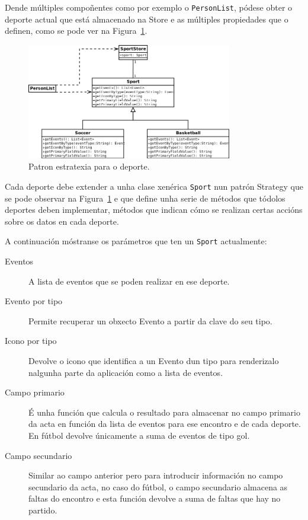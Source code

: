   Dende múltiples compoñentes como por exemplo o \lstinline{PersonList}, pódese 
obter o deporte actual que está almacenado na Store e as múltiples propiedades 
que o definen, como se pode ver na Figura~\ref{fig:design:strategy}.

    \begin{figure}[h!]
      \begin{center}
      \includegraphics[width=0.8\textwidth]{./img/diagrams/sport_diagram.png}
      \caption{Patron estratexia para o deporte.}
      \label{fig:design:strategy}
      \end{center}
    \end{figure}

  Cada deporte debe extender a unha clase xenérica \lstinline{Sport} nun 
patrón Strategy\cite{book:patterns} que se pode observar na 
Figura~\ref{fig:design:strategy} e que define unha serie de métodos que tódolos 
deportes deben implementar, métodos que indican cómo se realizan certas accións 
sobre os datos en cada deporte.

  A continuación móstranse os parámetros que ten un \lstinline{Sport} 
actualmente:

  \begin{description}
   \item [Eventos] A lista de eventos que se poden realizar en ese deporte.
   \item [Evento por tipo] Permite recuperar un obxecto Evento a partir da 
clave do seu tipo.
   \item [Icono por tipo] Devolve o icono que identifica a un Evento dun 
tipo para renderizalo nalgunha parte da aplicación como a lista de eventos.
   \item [Campo primario] É unha función que calcula o resultado para 
almacenar no campo primario da acta en función da lista de eventos para ese 
encontro e de cada deporte. En fútbol devolve únicamente a suma de eventos de 
tipo gol.
   \item [Campo secundario] Similar ao campo anterior pero para introducir 
información no campo secundario da acta, no caso do fútbol, o campo secundario 
almacena as faltas do encontro e esta función devolve a suma de faltas que hay 
no partido.
  \end{description}

